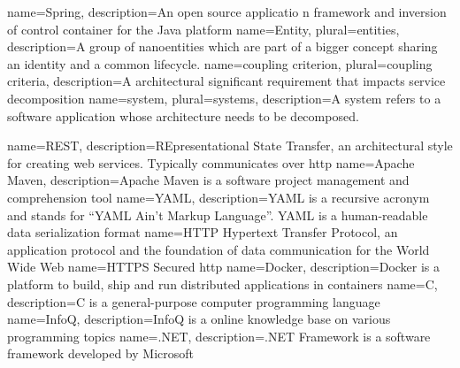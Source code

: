 {
  name={Spring},
  description={An open source applicatio	n framework and inversion of control container for the Java platform}
}
{
	name={Entity},
	plural={entities},
	description={A group of nanoentities which are part of a bigger concept sharing an identity and a common lifecycle.\cite{evans2003domain}}
}
{
	name={coupling criterion},
	plural={coupling criteria},
	description={A architectural significant requirement that impacts service decomposition}
}
{
	name={system},
	plural={systems},
	description={A system refers to a software application whose architecture needs to be decomposed.}
}

{
  name={REST},
  description={REpresentational State Transfer, an architectural style for creating web services. Typically communicates over \gls{http}}
}
{
  name={Apache Maven},
  description={Apache Maven is a software project management and comprehension tool}
}
{
  name={YAML},
  description={YAML is a recursive acronym and stands for \enquote{YAML Ain't Markup Language}. YAML is a human-readable data serialization format}
}
{
  name={HTTP}
}
{
	Hypertext Transfer Protocol, an application protocol and the foundation of data communication for the World Wide Web \cite{http_wikipedia}
}
{
  name={HTTPS}
}
{
	Secured \gls{http}
}
{
  name={Docker},
  description={Docker is a platform to build, ship and run distributed applications in containers}
}
{
  name={C},
  description={C is a general-purpose computer programming language}
}
{
  name={InfoQ},
  description={InfoQ is a online knowledge base on various programming topics}
}
{
  name={.NET},
  description={.NET Framework is a software framework developed by Microsoft}
}

